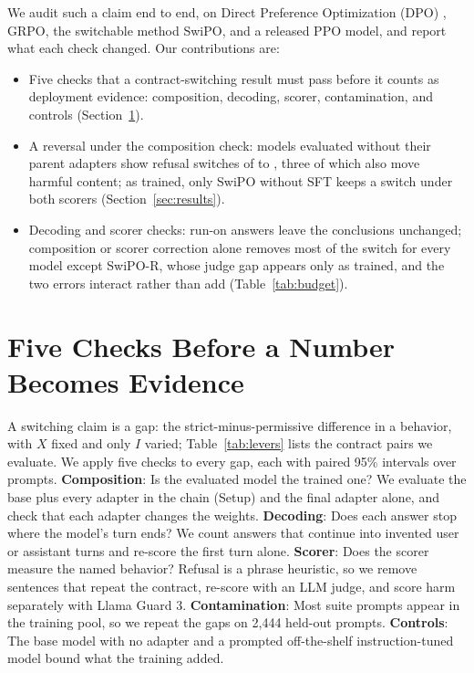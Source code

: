 \documentclass[letterpaper]{article} %
\begin{document}

We audit such a claim end to end, on Direct Preference Optimization (DPO) \cite{rafailov2023direct}, GRPO, the switchable method SwiPO, and a released PPO model, and report what each check changed. Our contributions are:
\begin{itemize}
    \item Five checks that a contract-switching result must pass before it counts as deployment evidence: composition, decoding, scorer, contamination, and controls (Section~\ref{sec:checks}).
    \item A reversal under the composition check: models evaluated without their parent adapters show refusal switches of \nFinalLo{} to \nFinalHi{}, three of which also move harmful content; as trained, only SwiPO without SFT keeps a switch under both scorers (Section~\ref{sec:results}).
    \item Decoding and scorer checks: run-on answers leave the conclusions unchanged; composition or scorer correction alone removes most of the switch for every model except \mbox{SwiPO-R}, whose judge gap appears only as trained, and the two errors interact rather than add (Table~\ref{tab:budget}).
\end{itemize}

\section{Five Checks Before a Number Becomes Evidence}
\label{sec:checks}

A switching claim is a gap: the strict-minus-permissive difference in a behavior, with $X$ fixed and only $I$ varied; Table~\ref{tab:levers} lists the contract pairs we evaluate. We apply five checks to every gap, each with paired 95\% intervals over prompts. \textbf{Composition}: Is the evaluated model the trained one? We evaluate the base plus every adapter in the chain (Setup) and the final adapter alone, and check that each adapter changes the weights. \textbf{Decoding}: Does each answer stop where the model's turn ends? We count answers that continue into invented user or assistant turns and re-score the first turn alone. \textbf{Scorer}: Does the scorer measure the named behavior? Refusal is a phrase heuristic, so we remove sentences that repeat the contract, re-score with an LLM judge, and score harm separately with Llama Guard 3. \textbf{Contamination}: Most suite prompts appear in the training pool, so we repeat the gaps on 2,444 held-out prompts. \textbf{Controls}: The base model with no adapter and a prompted off-the-shelf instruction-tuned model bound what the training added.
\end{document}
